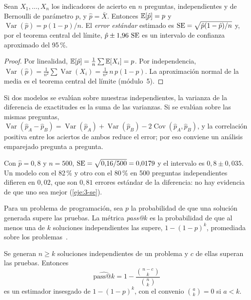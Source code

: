 \begin{proposicion}\label{prop:se}
Sean $X_1,\dots,X_n$ los indicadores de acierto en $n$ preguntas, independientes y de Bernoulli de parámetro $p$, y $\hat p=\bar X$. Entonces $\mathbb{E}[\hat p]=p$ y $\operatorname{Var}(\hat p)=p(1-p)/n$. El \emph{error estándar} estimado es $\operatorname{SE}=\sqrt{\hat p(1-\hat p)/n}$ y, por el teorema central del límite, $\hat p\pm 1{,}96\,\operatorname{SE}$ es un intervalo de confianza aproximado del 95\,\%.
\end{proposicion}

\begin{proof}
Por linealidad, $\mathbb{E}[\hat p]=\frac1n\sum\mathbb{E}[X_i]=p$. Por independencia, $\operatorname{Var}(\hat p)=\frac{1}{n^{2}}\sum\operatorname{Var}(X_i)=\frac{1}{n^{2}}\,n\,p(1-p)$. La aproximación normal de la media es el teorema central del límite (módulo~5).
\end{proof}

Si dos modelos se evalúan sobre muestras independientes, la varianza de la diferencia de exactitudes es la suma de las varianzas. Si se evalúan sobre las mismas preguntas, $\operatorname{Var}(\hat p_A-\hat p_B)=\operatorname{Var}(\hat p_A)+\operatorname{Var}(\hat p_B)-2\operatorname{Cov}(\hat p_A,\hat p_B)$, y la correlación positiva entre los aciertos de ambos reduce el error; por eso conviene un análisis emparejado pregunta a pregunta.

\begin{ejemplo}\label{ej:se}
Con $\hat p=0{,}8$ y $n=500$, $\operatorname{SE}=\sqrt{0{,}16/500}=0{,}0179$ y el intervalo es $0{,}8\pm 0{,}035$. Un modelo con el 82\,\% y otro con el 80\,\% en 500 preguntas independientes difieren en $0{,}02$, que son $0{,}81$ errores estándar de la diferencia: no hay evidencia de que uno sea mejor (\cref{eje:3-se}).
\end{ejemplo}

\begin{definicion}[pass@$k$]\label{def:passk}
Para un problema de programación, sea $p$ la probabilidad de que una solución generada supere las pruebas. La métrica \emph{pass@$k$} es la probabilidad de que al menos una de $k$ soluciones independientes las supere, $1-(1-p)^{k}$, promediada sobre los problemas~\cite[§2.1]{chen-codex}.
\end{definicion}

\begin{proposicion}\label{prop:passk}
Se generan $n\ge k$ soluciones independientes de un problema y $c$ de ellas superan las pruebas. Entonces
\[
\widehat{\text{pass@}k}=1-\frac{\binom{n-c}{k}}{\binom{n}{k}}
\]
es un estimador insesgado de $1-(1-p)^{k}$, con el convenio $\binom{a}{k}=0$ si $a<k$.
\end{proposicion}

